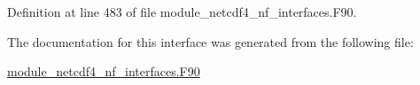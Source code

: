 Definition at line 483 of file module\+\_\+netcdf4\+\_\+nf\+\_\+interfaces.\+F90.



The documentation for this interface was generated from the following file\+:\begin{DoxyCompactItemize}
\item 
\hyperlink{module__netcdf4__nf__interfaces_8F90}{module\+\_\+netcdf4\+\_\+nf\+\_\+interfaces.\+F90}\end{DoxyCompactItemize}
